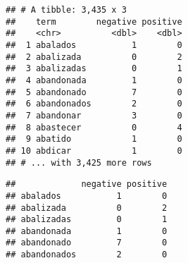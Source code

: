 \documentclass[
]{article}
\newenvironment{Shaded}{\begin{snugshade}}{\end{snugshade}}
\newcommand{\CommentTok}[1]{\textcolor[rgb]{0.56,0.35,0.01}{\textit{#1}}}
\newcommand{\DataTypeTok}[1]{\textcolor[rgb]{0.13,0.29,0.53}{#1}}
\newcommand{\DecValTok}[1]{\textcolor[rgb]{0.00,0.00,0.81}{#1}}
\newcommand{\KeywordTok}[1]{\textcolor[rgb]{0.13,0.29,0.53}{\textbf{#1}}}
\newcommand{\NormalTok}[1]{#1}
\newcommand{\OperatorTok}[1]{\textcolor[rgb]{0.81,0.36,0.00}{\textbf{#1}}}
\newcommand{\OtherTok}[1]{\textcolor[rgb]{0.56,0.35,0.01}{#1}}
\newcommand{\StringTok}[1]{\textcolor[rgb]{0.31,0.60,0.02}{#1}}
\begin{document}
\begin{Shaded}
\end{Shaded}

\begin{verbatim}
## # A tibble: 3,435 x 3
##    term        negative positive
##    <chr>          <dbl>    <dbl>
##  1 abalados           1        0
##  2 abalizada          0        2
##  3 abalizadas         0        1
##  4 abandonada         1        0
##  5 abandonado         7        0
##  6 abandonados        2        0
##  7 abandonar          3        0
##  8 abastecer          0        4
##  9 abatido            1        0
## 10 abdicar            1        0
## # ... with 3,425 more rows
\end{verbatim}

\begin{Shaded}
\end{Shaded}

\begin{verbatim}
##             negative positive
## abalados           1        0
## abalizada          0        2
## abalizadas         0        1
## abandonada         1        0
## abandonado         7        0
## abandonados        2        0
\end{verbatim}
\end{document}
